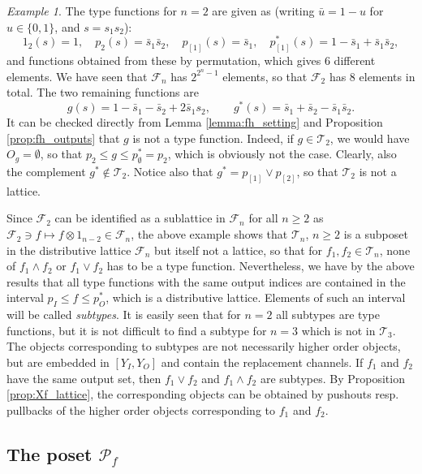 \documentclass[12pt]{article}
\theoremstyle{definition}
\theoremstyle{remark}
\newtheorem{exm}{Example}
\def\Te{\mathcal T}
\def\Fe{\mathcal F}
\def\Pe{\mathcal P}
\begin{document}
\begin{exm}\label{exm:T2} The type functions for $n=2$ are given as (writing $\bar u=1-u$
for $u\in \{0,1\}$, and $s=s_1s_2$):
\[
1_2(s)=1,\quad p_{2}(s)=\bar s_1\bar s_2,\quad p_{[1]}(s)=\bar s_1, \quad 
p_{[1]}^*(s)= 1-\bar s_1+\bar
s_1\bar s_2,
\]
and functions  obtained from these by permutation, which gives 6 different elements.
We have seen that  $\Fe_n$ has $2^{2^n-1}$ elements, so that $\Fe_2$ has 8
elements in total. The two remaining functions  are
\[
g(s)=1-\bar s_1-\bar s_2+2\bar s_1s_2,\qquad g^*(s)=\bar s_1+\bar s_2-\bar s_1\bar s_2.
\]
It can be  checked directly from Lemma \ref{lemma:fh_setting} and
Proposition \ref{prop:fh_outputs} that $g$ is not a type function. Indeed, if $g\in \Te_2$, we would have $O_g=\emptyset$, so that
$p_{2}\le g\le p_\emptyset^*=p_{2}$, which is obviously not the case. Clearly, also the
complement $g^*\notin \Te_2$. Notice also that $g^*=p_{[1]}\vee p_{[2]}$, so that
$\Te_2$ is not a lattice. 

\end{exm}


Since $\Fe_2$ can be identified as a sublattice in $\Fe_n$ for
all $n\ge 2$ as $\Fe_2\ni f\mapsto f\otimes 1_{n-2}\in \Fe_n$, the above example shows
that  $\Te_n$, $n\ge 2$ is a  subposet in the distributive lattice 
$\Fe_n$ but itself not a lattice,  so that for $f_1,f_2\in
\Te_n$, none of $f_1\wedge f_2$ or $f_1\vee f_2$ has to be a type function.
Nevertheless, we have by the above results that all type functions with the same output
indices are contained in the interval $p_I\le f\le p_O^*$, which is a distributive
lattice. Elements of such an interval  will be called {\em subtypes}. It is easily seen
that for $n=2$ all subtypes are type functions, but it is not difficult to find a subtype
for $n=3$ which is not in $\Te_3$. The objects corresponding to
subtypes are not necessarily
higher order objects, but are embedded in  $[Y_I,Y_O]$ and contain the replacement
channels. If $f_1$ and $f_2$ have the same output set, then  $f_1\vee f_2$ and $f_1\wedge
f_2$ are subtypes. {\color{red}By Proposition \ref{prop:Xf_lattice}, the corresponding objects can be
obtained by pushouts resp. pullbacks of the higher order objects corresponding to $f_1$
and $f_2$.}




\subsection{The poset $\Pe_f$}
\end{document}
